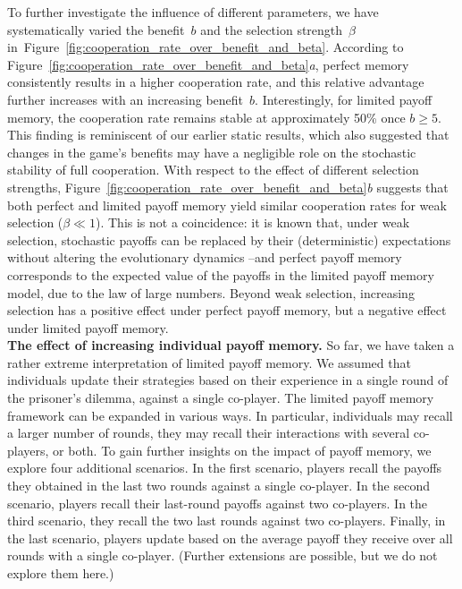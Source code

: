 \documentclass[11pt]{article}
\newcommand{\FigDependenceParameters}{Figure~\ref{fig:cooperation_rate_over_benefit_and_beta}}
\theoremstyle{plainCl1}
\theoremstyle{plainCl2}
\begin{document}

To further investigate the influence of different parameters, we have systematically varied the benefit~$b$ and the selection strength~$\beta$ in~\FigDependenceParameters.
According to \FigDependenceParameters{\it a}, perfect memory consistently results in a higher cooperation rate, and this relative advantage further increases with an increasing benefit~$b$. 
Interestingly, for limited payoff memory, the cooperation rate remains stable at approximately 50\% once \(b \!\ge\! 5\).
This finding is reminiscent of our earlier static results, which also suggested that changes in the game's benefits may have a negligible role on the stochastic stability of full cooperation.  
With respect to the effect of different selection strengths, \FigDependenceParameters{\it b} suggests that both perfect and limited payoff memory yield similar cooperation rates for weak selection (\(\beta \!\ll\! 1\)). This is not a coincidence: it is known that, under weak selection, stochastic payoffs can be replaced by their (deterministic) expectations without altering the evolutionary dynamics \citep{mcavoy:NHB:2020}--and perfect payoff memory corresponds to the expected value of the payoffs in the limited payoff memory model, due to the law of large numbers.
Beyond weak selection, increasing selection has a positive effect under perfect payoff memory, but a negative effect under limited payoff memory.\\


\noindent 
{\bf The effect of increasing individual payoff memory.}
So far, we have taken a rather extreme interpretation of limited payoff memory. 
We assumed that individuals update their strategies based on their experience in a single round of the prisoner's dilemma, against a single co-player. 
The limited payoff memory framework can be expanded in various ways. 
In particular, individuals may recall a larger number of rounds, they may recall their interactions with several co-players, or both. 
To gain further insights on the impact of payoff memory, we explore four additional scenarios. 
In the first scenario, players recall the payoffs they obtained in the last two rounds against a single co-player. 
In the second scenario, players recall their last-round payoffs against two co-players. 
In the third scenario, they recall the two last rounds against two co-players. 
Finally, in the last scenario, players update based on the average payoff they
receive over all rounds with a single co-player. (Further extensions are possible, but we do not explore them here.)
\end{document}
